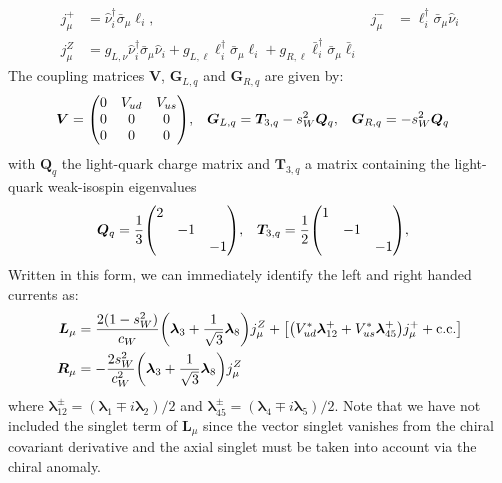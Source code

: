 \documentclass[a4paper,11pt]{article} \pdfoutput=1
\newcommand{\sibar}{{\bar{\sigma}}}
\begin{document}
\begin{align}
	j^{+}_{\mu}
	                                             & =
	\hat{\nu}_{i}^{\dagger}\sibar_{\mu}\ell_{i}, &
	j^{-}_{\mu}
	                                             & =
	\ell_{i}^{\dagger}\sibar_{\mu}\hat{\nu}_{i}      \\
	j^{Z}_{\mu}
	                                             & =
	g_{L,\nu}\hat{\nu}_{i}^{\dagger}\sibar_{\mu}\hat{\nu}_{i}
	+ g_{L,\ell}\ell_{i}^{\dagger}\sibar_{\mu}\ell_{i}
	+ g_{R,\ell}\bar{\ell}_{i}^{\dagger}\sibar_{\mu}\bar{\ell}_{i}
\end{align}
The coupling matrices \(\bm{V}\), \(\bm{G}_{L,q}\) and \(\bm{G}_{R,q}\)
are given by:
\begin{align}
	\bm{V}
	        & =
	\mqty(0 & V_{ud} & V_{us} \\ 0&0&0\\ 0&0&0),
	        &
	\bm{G}_{L,q}
	        & =
	\bm{T}_{3,q} - s_{W}^{2}\bm{Q}_{q},
	        &
	\bm{G}_{R,q}
	        & =
	-s_{W}^{2}\bm{Q}_{q}
\end{align}
with \(\bm{Q}_{q}\) the light-quark charge matrix and \(\bm{T}_{3,q}\) a matrix
containing the light-quark weak-isospin eigenvalues
\begin{align}
	\bm{Q}_{q}
	 & =
	\frac{1}{3}\mqty(\dmat{2,-1,-1}),
	 &
	\bm{T}_{3,q}
	 & =
	\frac{1}{2}\mqty(\dmat{1,-1,-1}),
\end{align}
Written in this form, we can immediately identify the left and right handed currents as:
\begin{align}
	\bm{L}_{\mu}
	 & =
	\frac{2(1-s_{W}^{2})}{c_{W}}\qty(\bm{\lambda}_{3}+\frac{1}{\sqrt{3}}\bm{\lambda}_{8})j^{Z}_{\mu}
	+
	\qty[
	\qty(
	V^{*}_{ud}\bm{\lambda}^{+}_{12} + V^{*}_{us}\bm{\lambda}^{+}_{45}
	)j^{+}_{\mu}
	+\mathrm{c.c.}
	]\notag \\
	\bm{R}_{\mu}
	 & =
	-\frac{2s_{W}^{2}}{c_{W}^{2}}
	\qty(\bm{\lambda}_{3}+\frac{1}{\sqrt{3}}\bm{\lambda}_{8})j^{Z}_{\mu}
\end{align}
where \(\bm{\lambda}^{\pm}_{12} = (\bm{\lambda}_{1} \mp i\bm{\lambda}_{2})/2\)
and \(\bm{\lambda}^{\pm}_{45} = (\bm{\lambda}_{4} \mp i\bm{\lambda}_{5})/2\).
Note that we have not included the singlet term of \(\bm{L}_{\mu}\) since the
vector singlet vanishes from the chiral covariant derivative and the axial
singlet must be taken into account via the chiral anomaly.
\end{document}
